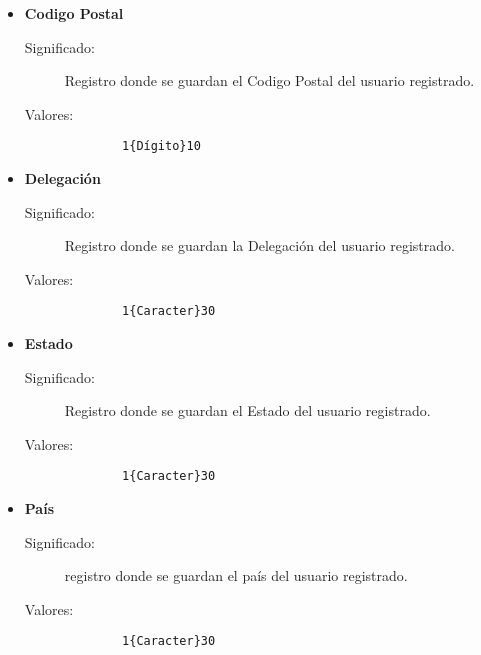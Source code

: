\begin{itemize}
  \item \textbf{Codigo Postal}\label{dd:cp}
    \begin{description}
      \item [Significado:] Registro donde se guardan el Codigo Postal del usuario registrado.
      \item [Valores:]{\begin{lstlisting}
        1{Dígito}10\end{lstlisting}}
    \end{description}
  \item \textbf{Delegación}\label{dd:deleg}
    \begin{description}
      \item [Significado:] Registro donde se guardan la Delegación del usuario registrado.
      \item [Valores:]{\begin{lstlisting}
        1{Caracter}30\end{lstlisting}}
    \end{description}
  \item \textbf{Estado}\label{dd:edo}
    \begin{description}
      \item [Significado:] Registro donde se guardan el Estado del usuario registrado.
      \item [Valores:]{\begin{lstlisting}
        1{Caracter}30\end{lstlisting}}
    \end{description}
  \item \textbf{País}\label{dd:pais}
    \begin{description}
      \item [Significado:] registro donde se guardan el país del usuario registrado.
      \item [Valores:]{\begin{lstlisting}
        1{Caracter}30\end{lstlisting}}
    \end{description}
\end{itemize}



